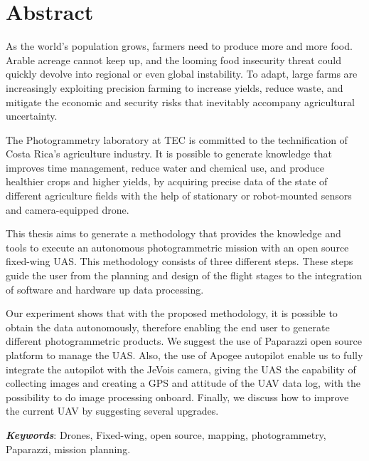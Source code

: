 \section*{Abstract}
As the world’s population grows, farmers need to produce more and more food. Arable acreage cannot keep up, and the looming food insecurity threat could quickly devolve into regional or even global instability. To adapt, large farms are increasingly exploiting precision farming to increase yields, reduce waste, and mitigate the economic and security risks that inevitably accompany agricultural uncertainty.

The  Photogrammetry laboratory at TEC is committed to the technification of  Costa Rica's agriculture industry. It is possible to generate knowledge that improves time management, reduce water and chemical use, and produce healthier crops and higher yields, by acquiring precise data of the state of different agriculture fields with the help of stationary or robot-mounted sensors and camera-equipped drone.


This thesis aims to generate a methodology that provides the knowledge and tools to execute an autonomous photogrammetric mission with an open source fixed-wing UAS.  This methodology consists of three different steps. These steps guide the user from the planning and design of the flight stages to the integration of software and hardware up data processing.

Our experiment shows that with the proposed methodology, it is possible to obtain the data autonomously, therefore enabling the end user to generate different photogrammetric products. We suggest the use of Paparazzi open source platform to manage the UAS. Also, the use of  Apogee autopilot enable us to fully integrate the autopilot with the JeVois camera, giving the UAS the capability of collecting images and creating a GPS and attitude of the UAV data log, with the possibility to do image processing onboard.
Finally, we discuss how to improve the current UAV by suggesting several upgrades.

\textbf{\textit{Keywords}}: Drones, Fixed-wing, open source, mapping, photogrammetry, Paparazzi, mission planning.